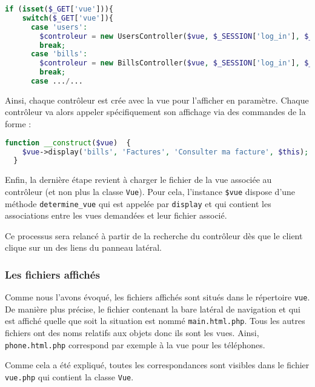 \begin{lstlisting}[language=php]
  if (isset($_GET['vue'])){
    switch($_GET['vue']){
      case 'users':
        $controleur = new UsersController($vue, $_SESSION['log_in'], $_SESSION['login_level']);
        break;
      case 'bills':
        $controleur = new BillsController($vue, $_SESSION['log_in'], $_SESSION['login_level']);
        break;
      case .../...
\end{lstlisting}

Ainsi, chaque contrôleur est crée avec la vue pour l'afficher en paramètre. Chaque contrôleur va alors appeler spécifiquement son affichage via des commandes de la forme :

\begin{lstlisting}[language=php]
  function __construct($vue)  {
    $vue->display('bills', 'Factures', 'Consulter ma facture', $this);
  }
\end{lstlisting}

Enfin, la dernière étape revient à charger le fichier de la vue associée au contrôleur (et non plus la classe \texttt{Vue}). Pour cela, l'instance \texttt{\$vue} dispose d'une méthode \texttt{determine\_vue} qui est appelée par \texttt{display} et qui contient les associations entre les vues demandées et leur fichier associé.

Ce processus sera relancé à partir de la recherche du contrôleur dès que le client clique sur un des liens du panneau latéral.

\subsubsection{Les fichiers affichés}
Comme nous l'avons évoqué, les fichiers affichés sont situés dans le répertoire \texttt{vue}. De manière plus précise, le fichier contenant la bare latéral de navigation et qui est affiché quelle que soit la situation est nommé \texttt{main.html.php}. Tous les autres fichiers ont des noms relatifs aux objets donc ils sont les vues. Ainsi, \texttt{phone.html.php} correspond par exemple à la vue pour les téléphones.

Comme cela a été expliqué, toutes les correspondances sont visibles dans le fichier \texttt{vue.php} qui contient la classe \texttt{Vue}.

